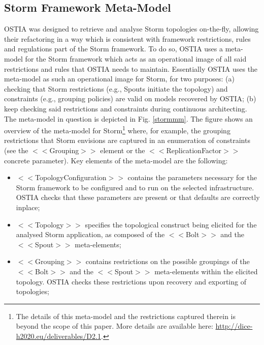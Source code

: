 \subsection{Storm Framework Meta-Model}

OSTIA was designed to retrieve and analyse Storm topologies on-the-fly, allowing their refactoring in a way which is consistent with framework restrictions, rules and regulations part of the Storm framework. To do so, OSTIA uses a meta-model for the Storm framework which acts as an operational image of all said restrictions and rules that OSTIA needs to maintain. 
Essentially OSTIA uses the meta-model as such an operational image for Storm, for two purposes: (a) checking that Storm restrictions (e.g., Spouts initiate the topology) and constraints (e.g., grouping policies) are valid on models recovered by OSTIA; (b) keep checking said restrictions and constraints during continuous architecting. 
The meta-model in question is depicted in Fig. \ref{stormmm}. The figure shows an overview of the meta-model for Storm\footnote{The details of this meta-model and the restrictions captured therein is beyond the scope of this paper. More details are available here: \url{http://dice-h2020.eu/deliverables/D2.1}.} where, for example, the grouping restrictions that Storm envisions are captured in an enumeration of constraints (see the $<<$Grouping$>>$ element or the $<<$ReplicationFactor$>>$ concrete parameter). Key elements of the meta-model are the following:
\begin{itemize}
\item $<<$TopologyConfiguration$>>$ contains the parameters necessary for the Storm framework to be configured and to run on the selected infrastructure. OSTIA checks that these parameters are present or that defaults are correctly inplace;
\item $<<$Topology$>>$ specifies the topological construct being elicited for the analysed Storm application, as composed of the $<<$Bolt$>>$ and  the $<<$Spout$>>$ meta-elements;
\item  $<<$Grouping$>>$ contains restrictions on the possible groupings of the $<<$Bolt$>>$ and the $<<$Spout$>>$ meta-elements within the elicited topology. OSTIA checks these restrictions upon recovery and exporting of topologies;
\end{itemize}

